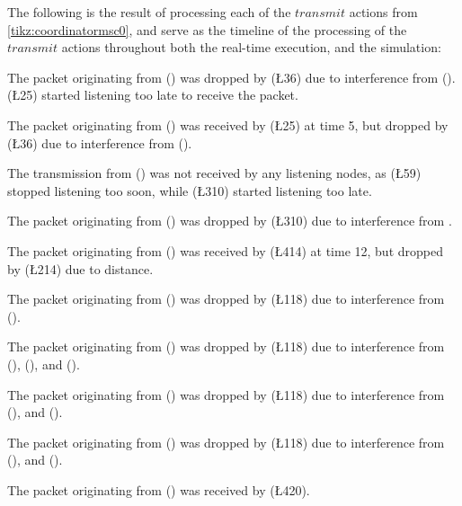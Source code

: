 The following is the result of processing each of the $\mathit{transmit}$ actions from
\autoref{tikz:coordinatormsc0}, and serve as the timeline of the processing of the $\mathit{transmit}$ actions
throughout both the real-time execution, and the simulation:
%
\begin{description}[leftmargin=2em,style=nextline]
    \item[\T{4}{3}] The packet originating from  () was dropped by  (\L{3}{6}) due to
          interference from  ().  (\L{2}{5}) started listening too late to receive the
          packet.
    \item[\T{1}{5}] The packet originating from  () was received by  (\L{2}{5}) at
          time 5, but dropped by  (\L{3}{6}) due to interference from  ().
    \item[\T{1}{10}] The transmission from  () was not received by any listening nodes, as
           (\L{5}{9}) stopped listening too soon, while  (\L{3}{10}) started listening too
          late.
    \item[\T{2}{10}] The packet originating from  () was dropped by  (\L{3}{10}) due
          to interference from .
    \item[\T{5}{12}] The packet originating from  () was received by  (\L{4}{14}) at
          time 12, but dropped by  (\L{2}{14}) due to distance.
    \item[\T{3}{16}] The packet originating from  () was dropped by  (\L{1}{18}) due
          to interference from  ().
    \item[\T{4}{17}] The packet originating from  () was dropped by  (\L{1}{18}) due
          to interference from  (),  (), and  ().
    \item[\T{2}{18}] The packet originating from  () was dropped by  (\L{1}{18}) due
          to interference from  (), and  ().
    \item[\T{5}{18}] The packet originating from  () was dropped by  (\L{1}{18}) due
          to interference from  (), and  ().
    \item[\T{3}{20}] The packet originating from  () was received by  (\L{4}{20}).
\end{description}

